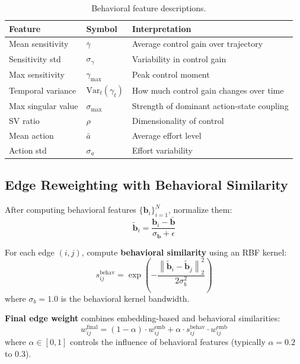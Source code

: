 \documentclass[11pt,a4paper]{article}
\newcommand{\vect}[1]{\mathbf{#1}}
\newcommand{\norm}[1]{\left\|#1\right\|}
\begin{document}
\begin{table}[h]
\centering
\begin{tabular}{@{}llp{7cm}@{}}
\toprule
\textbf{Feature} & \textbf{Symbol} & \textbf{Interpretation} \\
\midrule
Mean sensitivity & $\bar{\gamma}$ & Average control gain over trajectory \\
Sensitivity std & $\sigma_\gamma$ & Variability in control gain \\
Max sensitivity & $\gamma_{\max}$ & Peak control moment \\
Temporal variance & $\text{Var}_t(\gamma_t)$ & How much control gain changes over time \\
Max singular value & $\sigma_{\max}$ & Strength of dominant action-state coupling \\
SV ratio & $\rho$ & Dimensionality of control \\
Mean action & $\bar{a}$ & Average effort level \\
Action std & $\sigma_a$ & Effort variability \\
\bottomrule
\end{tabular}
\caption{Behavioral feature descriptions.}
\end{table}

\subsection{Edge Reweighting with Behavioral Similarity}

After computing behavioral features $\{\vect{b}_i\}_{i=1}^N$, normalize them:
\begin{equation}
    \tilde{\vect{b}}_i = \frac{\vect{b}_i - \bar{\vect{b}}}{\sigma_{\vect{b}} + \epsilon}
\end{equation}

For each edge $(i, j)$, compute \textbf{behavioral similarity} using an RBF kernel:
\begin{equation}
    s_{ij}^{\text{behav}} = \exp\left(-\frac{\norm{\tilde{\vect{b}}_i - \tilde{\vect{b}}_j}_2^2}{2\sigma_b^2}\right)
\end{equation}
where $\sigma_b = 1.0$ is the behavioral kernel bandwidth.

\textbf{Final edge weight} combines embedding-based and behavioral similarities:
\begin{equation}
    w_{ij}^{\text{final}} = (1 - \alpha) \cdot w_{ij}^{\text{emb}} + \alpha \cdot s_{ij}^{\text{behav}} \cdot w_{ij}^{\text{emb}}
\end{equation}
where $\alpha \in [0, 1]$ controls the influence of behavioral features (typically $\alpha = 0.2$ to $0.3$).
\end{document}

